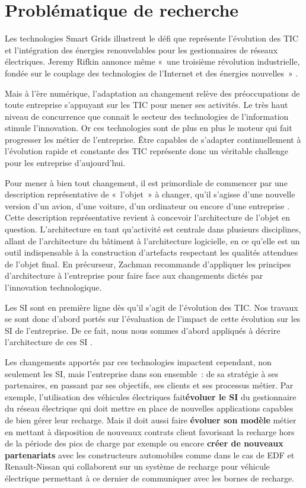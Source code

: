  
\section{Problématique de recherche}
Les technologies Smart Grids illustrent le défi que représente l'évolution des 
TIC et l'intégration des énergies renouvelables pour les gestionnaires de 
réseaux électriques. Jeremy Rifkin annonce même «~une troisième révolution 
industrielle, fondée sur le couplage des technologies de l’Internet et des 
énergies nouvelles~» \cite{rifkin2012troisieme}. 

Mais à l'ère numérique, l'adaptation au changement relève des préoccupations de 
toute entreprise s'appuyant sur les TIC pour mener ses 
activités. Le très haut niveau de concurrence que connait le secteur des 
technologies de l'information stimule l'innovation. Or ces technologies sont de 
plus en plus le moteur qui fait progresser les  métier de l'entreprise. Être 
capables de s'adapter continuellement à l'évolution rapide et 
constante des TIC représente donc un véritable challenge pour les entreprise 
d'aujourd'hui. 

Pour mener à bien tout changement, il est primordiale de commencer par une 
description représentative de «~l'objet~» à changer, qu'il s'agisse d'une 
nouvelle version d'un avion, d'une voiture, d'un ordinateur ou encore d'une 
entreprise \cite{zachman1997enterprise}. Cette description représentative 
revient à concevoir l'architecture de l'objet en question. L'architecture en 
tant qu'activité est centrale dans plusieurs disciplines, allant de 
l'architecture du bâtiment à l'architecture logicielle, en ce qu'elle est un 
outil indispensable à la construction d'artefacts respectant les qualités 
attendues de l'objet final. En précurseur, Zachman \cite{zachman1997enterprise} 
recommande d'appliquer les principes d'architecture à l'entreprise pour faire 
face aux changements dictés par l'innovation technologique.

Les SI sont en première ligne dès qu'il s'agit de l'évolution des TIC. Nos 
travaux se sont donc d'abord portés sur l'évaluation de l'impact de cette 
évolution sur les SI de l'entreprise. De ce fait, nous nous sommes d'abord 
appliqués à décrire l'architecture de ces SI \cite{seghiri2015simulation}. 

Les changements apportés par ces technologies impactent cependant, non seulement 
les SI, mais l'entreprise dans son ensemble~: de sa stratégie à ses partenaires, 
en passant par ses objectifs, ses clients et ses processus métier. Par exemple, 
l'utilisation des véhicules électriques fait\textbf{évoluer le SI} du 
gestionnaire du réseau électrique qui doit mettre en place de nouvelles 
applications capables de bien gérer leur recharge. Mais il doit aussi faire 
\textbf{évoluer son modèle} métier en mettant à disposition de nouveaux contrats 
client favorisant la recharge hors de la période des pics de charge par exemple 
ou encore \textbf{créer de nouveaux partenariats} avec les constructeurs 
automobiles comme dans le cas de EDF et Renault-Nissan qui collaborent sur un 
système de recharge pour véhicule électrique permettant à ce dernier de 
communiquer avec les bornes de recharge.

